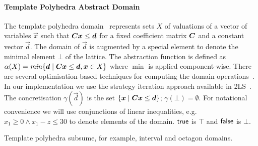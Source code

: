\paragraph{Template Polyhedra Abstract Domain}
%
The template polyhedra domain~\cite{sriram} represents sets $X$ of
valuations of a vector of variables $\vec{x}$ such that
${\boldsymbol C}{\boldsymbol x}\leq{\boldsymbol d}$ for a fixed coefficient matrix ${\boldsymbol C}$
and a constant vector $\vec{d}$. The domain of $\vec{d}$ is augmented
by a special element to denote the minimal element $\bot$ of the lattice.
%
The abstraction function is defined as $\alpha(X) = \mathit{min} \{{\boldsymbol d}\mid
{\boldsymbol C}{\boldsymbol x}\leq{\boldsymbol d}, {\boldsymbol x}\in X\}$ where $\min$ is
applied component-wise. There are several optimisation-based
techniques for computing the domain
operations~\cite{sriram,GS07b,BJKS15}. In our implementation we use
the strategy iteration approach available in 2LS~\cite{BJKS15}.
%
The concretisation $\gamma(\vec{d})$ is the set $\{{\boldsymbol x}\mid
{\boldsymbol C}{\boldsymbol x}\leq{\boldsymbol d}\}$; $\gamma(\bot)=\emptyset$.
%
For notational convenience we will use conjunctions of linear
inequalities, e.g.\ $x_1\geq 0 \wedge x_1-z\leq 30$ to denote elements
of the domain. $\mathsf{true}$ is $\top$ and $\mathsf{false}$ is $\bot$.

Template polyhedra subsume, for example, interval and octagon domains.

